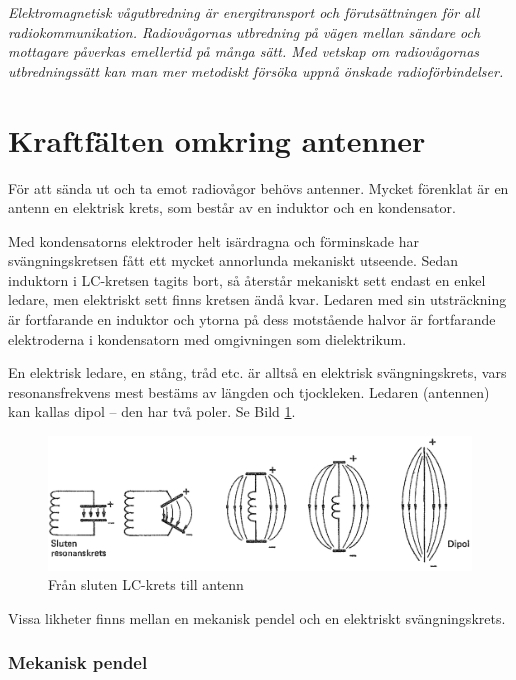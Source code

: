 \emph{Elektromagnetisk vågutbredning är energitransport och
  förutsättningen för all radiokommunikation. Radiovågornas utbredning
  på vägen mellan sändare och mottagare påverkas emellertid på många
  sätt. Med vetskap om radiovågornas utbredningssätt kan man mer
  metodiskt försöka uppnå önskade radioförbindelser.}

\section[Kraftfält antenner]{Kraftfälten omkring antenner}

För att sända ut och ta emot radiovågor behövs antenner. Mycket
förenklat är en antenn en elektrisk krets, som består av en induktor
och en kondensator.

Med kondensatorns elektroder helt isärdragna och förminskade har
svängningskretsen fått ett mycket annorlunda mekaniskt utseende. Sedan
induktorn i LC-kretsen tagits bort, så återstår mekaniskt sett endast
en enkel ledare, men elektriskt sett finns kretsen ändå kvar. Ledaren
med sin utsträckning är fortfarande en induktor och ytorna på dess
motstående halvor är fortfarande elektroderna i kondensatorn med
omgivningen som dielektrikum.

En elektrisk ledare, en stång, tråd etc. är alltså en elektrisk
svängningskrets, vars resonansfrekvens mest bestäms av längden och
tjockleken. Ledaren (antennen) kan kallas dipol -- den har två
poler. Se Bild \ref{fig:BildII7-01}.

\begin{figure}
\includegraphics[width=\textwidth]{images/cropped_pdfs/bild_2_7-01.pdf}
\caption{Från sluten LC-krets till antenn}
\label{fig:BildII7-01}
\end{figure}

Vissa likheter finns mellan en mekanisk pendel och en elektriskt
svängningskrets.

\subsubsection{Mekanisk pendel}

